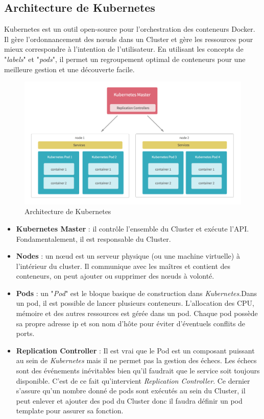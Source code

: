 \begin{onehalfspace}
\subsection{Architecture de Kubernetes}
Kubernetes est un outil open-source pour l'orchestration des conteneurs Docker. Il gère l'ordonnancement des nœuds dans un Cluster et gère les ressources pour mieux correspondre à l'intention de l'utilisateur. En utilisant les concepts de "\emph{labels}" et "\emph{pods}", il permet un regroupement optimal de conteneurs pour une meilleure gestion et une découverte facile.
\begin{figure}[H]
\centering
\includegraphics [scale=0.4]{chapitre3/assets/archkuber.png}
\caption{Architecture de Kubernetes \cite{kubernetes}}
\end{figure}

\begin{itemize}
\item \textbf{Kubernetes Master} : il contrôle l'ensemble du Cluster et exécute l'API. Fondamentalement, il est responsable du Cluster.

\item \textbf{Nodes} : un nœud est un serveur physique (ou une machine virtuelle) à l'intérieur du cluster. Il communique avec les maîtres et contient des conteneurs, on peut ajouter ou supprimer des nœuds à volonté.

\item \textbf{Pods} : un "\emph{Pod}" est le bloque basique de construction dans \emph{Kubernetes}.Dans un pod, il est possible de lancer plusieurs conteneurs. L'allocation des CPU, mémoire et des autres ressources est gérée dans un pod. Chaque pod possède sa propre adresse \acrshort{ip} et son nom d'hôte pour éviter d'éventuels conflits de ports.

\item \textbf{Replication Controller} : Il est vrai que le Pod est un composant puissant au sein de \emph{Kubernetes} mais il ne permet pas la gestion des échecs. Les échecs sont des événements inévitables bien qu'il faudrait que le service soit toujours disponible. C'est de ce fait qu'intervient \emph{Replication Controller}. Ce dernier s'assure qu'un nombre donné de pods sont exécutés au sein du Cluster, il peut enlever et ajouter des pod du Cluster donc il faudra définir un pod template pour assurer sa fonction.


\end{itemize}
\end{onehalfspace}
